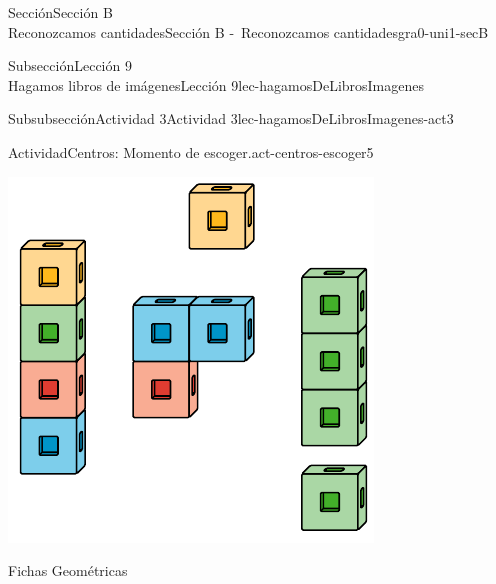 \begin{sectionptx}{Sección}{{\Large Sección B\\}Reconozcamos cantidades}{}{Sección B -~Reconozcamos cantidades}{}{}{gra0-uni1-secB}
\begin{subsectionptx}{Subsección}{{\normalsize Lección 9\\[-0.05cm]}Hagamos libros de imágenes}{}{Lección 9}{}{}{lec-hagamosDeLibrosImagenes}
\begin{subsubsectionptx}{Subsubsección}{Actividad 3}{}{Actividad 3}{}{}{lec-hagamosDeLibrosImagenes-act3}
\begin{activity}{Actividad}{Centros: Momento de escoger.}{act-centros-escoger5}
\begin{sidebyside}{2}{0.025}{0.025}{0.05}
\begin{sbspanel}{0.45}
\includegraphics[max width=\linewidth, center]{external/svg-source/tikz-file-128850.pdf}
\end{sbspanel}%
\begin{sbspanel}{0.45}%
Fichas Geométricas%
\par

\end{sbspanel}
\end{sidebyside}
\end{activity}
\end{subsubsectionptx}
\end{subsectionptx}
\end{sectionptx}

